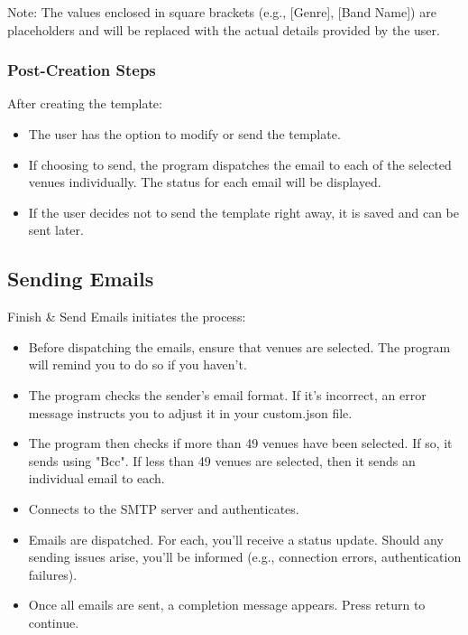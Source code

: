 \documentclass{article}
\begin{document}
	Note: The values enclosed in square brackets (e.g., [Genre], [Band Name]) are placeholders and will be replaced with the actual details provided by the user.
	
	\subsubsection*{Post-Creation Steps}
	After creating the template:
	\begin{itemize}
		\item The user has the option to modify or send the template.
		\item If choosing to send, the program dispatches the email to each of the selected venues individually. The status for each email will be displayed.
		\item If the user decides not to send the template right away, it is saved and can be sent later.
	\end{itemize}
	
	\subsection*{Sending Emails}
	Finish \& Send Emails initiates the process:
	\begin{itemize}
		\item Before dispatching the emails, ensure that venues are selected. The program will remind you to do so if you haven't.
		\item The program checks the sender's email format. If it's incorrect, an error message instructs you to adjust it in your custom.json file.
		\item The program then checks if more than 49 venues have been selected. If so, it sends using "Bcc". If less than 49 venues are selected, then it sends an individual email to each.
		\item Connects to the SMTP server and authenticates.
		\item Emails are dispatched. For each, you'll receive a status update. Should any sending issues arise, you'll be informed (e.g., connection errors, authentication failures).
		\item Once all emails are sent, a completion message appears. Press return to continue.
	\end{itemize}
	
\end{document}

